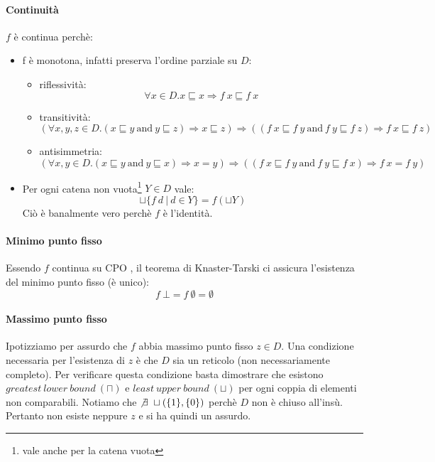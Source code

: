 \paragraph{Continuità} $f$ è continua perchè: 
\begin{itemize}
  \item f è monotona, infatti preserva l'ordine parziale su $D$:
  \begin{itemize}
    \item riflessività:
    $$
      \forall x \in D.x \sqsubseteq x \Rightarrow f\ x \sqsubseteq f\ x
    $$
    \item transitività:
    $$
      (\forall x,y,z \in D.(x \sqsubseteq y\ \text{and}\ y \sqsubseteq z) \Rightarrow
      x \sqsubseteq z)
      \Rightarrow 
      ((f\ x \sqsubseteq f\ y\ \text{and}\ f\ y \sqsubseteq f\ z) \Rightarrow
      f\ x \sqsubseteq f\ z)
    $$
    \item antisimmetria:
     $$
      (\forall x,y \in D.(x \sqsubseteq y\ \text{and}\ y \sqsubseteq x) \Rightarrow
      x = y)
      \Rightarrow 
      ((f\ x \sqsubseteq f\ y\ \text{and}\ f\ y \sqsubseteq f\ x) \Rightarrow
      f\ x = f\ y)
    $$
  \end{itemize}
  \item Per ogni catena non vuota\footnote{vale anche per la catena vuota} $Y \in D$ vale:
    $$ 
      \sqcup\{f\ d\ |\ d \in Y\} = f(\sqcup Y)
    $$
    Ciò è banalmente vero perchè $f$ è l'identità.
\end{itemize}
\paragraph{Minimo punto fisso}
Essendo $f$ continua su CPO , il teorema di Knaster-Tarski ci 
assicura l'esistenza del minimo punto fisso (è unico):  
$$
f\ \bot = f\ \emptyset = \emptyset
$$

\paragraph{Massimo punto fisso}
Ipotizziamo per assurdo che $f$ abbia massimo punto fisso $z \in D$.
Una condizione necessaria per l'esistenza di $z$ è che $D$ sia un reticolo 
(non necessariamente completo). Per verificare questa condizione basta 
dimostrare che esistono $greatest\ lower\ bound\ (\sqcap)$ e 
$least\ upper\ bound\ (\sqcup)$ per ogni coppia di elementi non comparabili.
Notiamo che $\not \exists\ \sqcup(\{1\},\{0\})$ perchè $D$ non è chiuso all'insù. 
Pertanto non esiste neppure $z$ e si ha quindi un assurdo.

